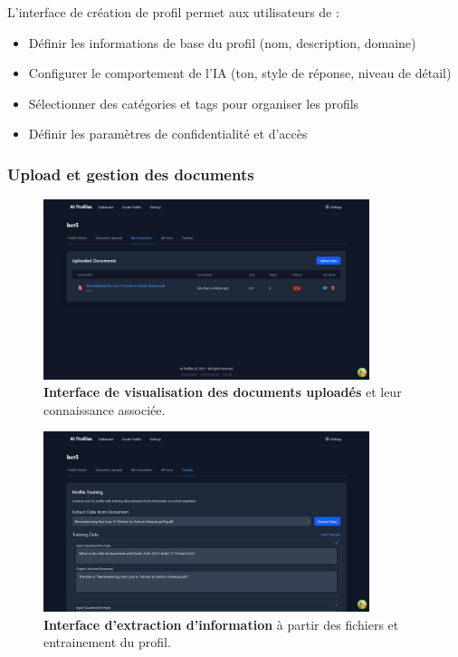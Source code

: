 L'interface de création de profil permet aux utilisateurs de :

\begin{itemize}
  \item Définir les informations de base du profil (nom, description, domaine)
  \item Configurer le comportement de l'IA (ton, style de réponse, niveau de détail)
  \item Sélectionner des catégories et tags pour organiser les profils
  \item Définir les paramètres de confidentialité et d'accès
\end{itemize}

\subsubsection{Upload et gestion des documents}

\begin{figure}[H]
  \centering
  \includegraphics[width=0.85\textwidth,keepaspectratio]{pfe-pics/ai-profile-creation/see_upladed_documents_knoladge.png}
  \caption{\textbf{Interface de visualisation des documents uploadés} et leur connaissance associée.}
  \label{fig:document_knowledge}
\end{figure}

\begin{figure}[H]
  \centering
  \includegraphics[width=0.85\textwidth,keepaspectratio]{pfe-pics/ai-profile-creation/extract_info_from_file_and_training_pfrile.png}
  \caption{\textbf{Interface d'extraction d'information} à partir des fichiers et entrainement du profil.}
  \label{fig:document_extraction}
\end{figure}

